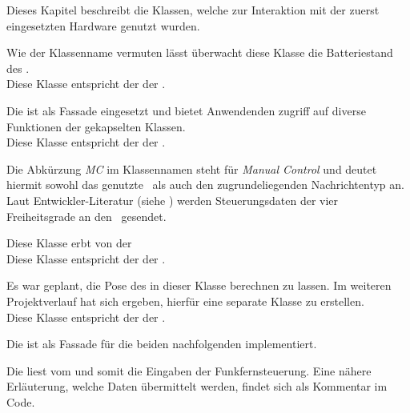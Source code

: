
Dieses Kapitel beschreibt die Klassen, welche zur Interaktion mit der zuerst eingesetzten Hardware genutzt wurden.







Wie der Klassenname vermuten lässt überwacht diese Klasse die Batteriestand des \Quad[s].
\\Diese Klasse entspricht der  der \Ar.


Die  ist als Fassade eingesetzt und bietet Anwendenden zugriff auf diverse Funktionen der gekapselten Klassen.
\\Diese Klasse entspricht der  der \Ar.


Die Abkürzung \textit{MC} im Klassennamen steht für \textit{Manual Control} und deutet hiermit sowohl das genutzte \Topic\ als auch den zugrundeliegenden Nachrichtentyp an. Laut Entwickler-Literatur (siehe ) werden Steuerungsdaten der vier Freiheitsgrade an den \Quad\ gesendet. 

Diese Klasse erbt von der 
\\Diese Klasse entspricht der  der \Ar.


Es war geplant, die Pose des \Quad[s] in dieser Klasse berechnen zu lassen. Im weiteren Projektverlauf hat sich ergeben, hierfür eine separate Klasse zu erstellen.
\\Diese Klasse entspricht der  der \Ar.


Die  ist als Fassade für die beiden nachfolgenden implementiert.


Die  liest vom  und somit die Eingaben der Funkfernsteuerung. Eine nähere Erläuterung, welche Daten übermittelt werden, findet sich als Kommentar im Code.


